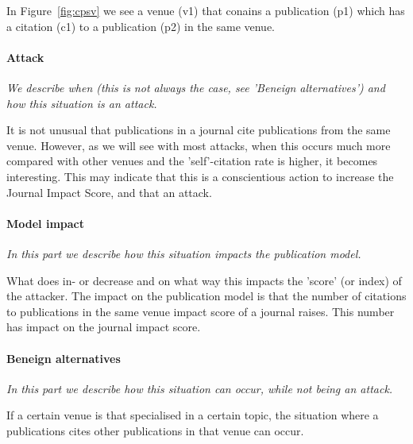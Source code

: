 \documentclass{ou-report}
\newcommand{\todo}[1]{{\color{red} TODO: #1}}
\newcommand{\outline}[1]{{\color{blue} #1}}
\begin{document}
In Figure~\ref{fig:cpsv} we see a venue (v1) that conains a publication (p1)
which has a citation (c1) to a publication (p2) in the same venue.
\paragraph{Attack}
\textit{We describe when (this is not always the case, see 'Beneign 
alternatives') and how this situation is an attack.} 

It is not unusual that 
publications in a journal cite publications from the same venue. However, as we 
will see with most attacks, when this occurs much more 
compared with other venues and the 'self'-citation rate is higher, it becomes 
interesting. This may indicate that this is a conscientious action to increase
the Journal Impact Score, and that an attack.

\paragraph{Model impact}
\textit{In this part we describe how this situation impacts the publication 
model.}

What does in- or decrease and on what way this impacts the 'score' (or index) 
of the attacker.
The impact on the publication model is that the number of citations to 
publications in the same venue impact score of a journal raises. This number has
impact on the journal impact score.

\paragraph{Beneign alternatives}
\textit{In this part we describe how this situation can occur, while not being
an attack.} 

If a certain venue is that specialised in a certain topic, the 
situation where a publications cites other publications in that venue can occur.


\end{document}
